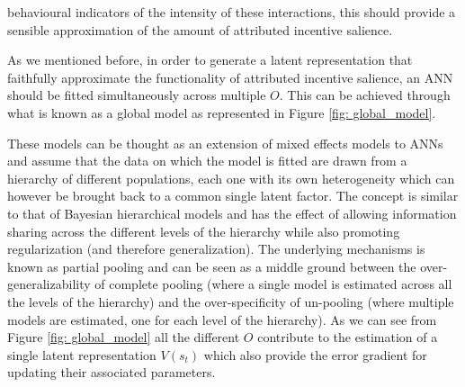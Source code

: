 behavioural indicators of the intensity of these interactions, this should provide a sensible approximation of the amount of attributed incentive salience. 

As we mentioned before, in order to generate a latent representation that faithfully approximate the functionality of attributed incentive salience, an ANN should be fitted simultaneously across multiple $O$. This can be achieved through what is known as a global model \cite{wang2019deep} as represented in Figure \ref{fig: global_model}.

These models can be thought as an extension of mixed effects models \cite{crawley2007mixed} to ANNs and assume that the data on which the model is fitted are drawn from a hierarchy of different populations, each one with its own heterogeneity which can however be brought back to a common single latent factor. The concept is similar to that of Bayesian hierarchical models \cite{gelman2020bayesian} and has the effect of allowing information sharing across the different levels of the hierarchy while also promoting regularization (and therefore generalization)\cite{gelman2020bayesian}. The underlying mechanisms is known as partial pooling \cite{gelman2020bayesian} and can be seen as a middle ground between the over-generalizability of complete pooling (where a single model is estimated across all the levels of the hierarchy) and the over-specificity of un-pooling (where multiple models are estimated, one for each level of the hierarchy). As we can see from Figure \ref{fig: global_model} all the different $O$ contribute to the estimation of a single latent representation $V(s_t)$ which also provide the error gradient for updating their associated parameters.

